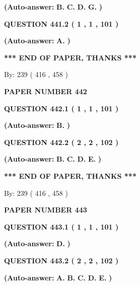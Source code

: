 \documentclass[12pt]{article}
\begin{document}
 
{\textbf{(Auto-answer:}}
{\textbf{\large{
B.}}}
{\textbf{\large{
C.}}}
{\textbf{\large{
D.}}}
{\textbf{\large{
G.}}}
{\textbf{)}}
 
 
  
  
{\textbf{\large{QUESTION
441.2 
 ( 1 , 1 , 101 )
}}}
 
 
{\textbf{(Auto-answer:}}
{\textbf{\large{
A.}}}
{\textbf{)}}
 
 
   
   
\vspace{1.0in} 
{\textbf{\large{ *** END OF PAPER, THANKS *** }}} 
   
   
\hspace{1.0in} By: 
 239 ( 416 ,  458 )
   
   
   
   
\newpage 
\setcounter{page}{ 
   442001 } 
   
   
 {\textbf{ \Large{ PAPER NUMBER  442  }}}
   
   
  
  
{\textbf{\large{QUESTION
442.1 
 ( 1 , 1 , 101 )
}}}
 
 
{\textbf{(Auto-answer:}}
{\textbf{\large{
B.}}}
{\textbf{)}}
 
 
  
  
{\textbf{\large{QUESTION
442.2 
 ( 2 , 2 , 102 )
}}}
 
 
{\textbf{(Auto-answer:}}
{\textbf{\large{
B.}}}
{\textbf{\large{
C.}}}
{\textbf{\large{
D.}}}
{\textbf{\large{
E.}}}
{\textbf{)}}
 
 
   
   
\vspace{1.0in} 
{\textbf{\large{ *** END OF PAPER, THANKS *** }}} 
   
   
\hspace{1.0in} By: 
 239 ( 416 ,  458 )
   
   
   
   
\newpage 
\setcounter{page}{ 
   443001 } 
   
   
 {\textbf{ \Large{ PAPER NUMBER  443  }}}
   
   
  
  
{\textbf{\large{QUESTION
443.1 
 ( 1 , 1 , 101 )
}}}
 
 
{\textbf{(Auto-answer:}}
{\textbf{\large{
D.}}}
{\textbf{)}}
 
 
  
  
{\textbf{\large{QUESTION
443.2 
 ( 2 , 2 , 102 )
}}}
 
 
{\textbf{(Auto-answer:}}
{\textbf{\large{
A.}}}
{\textbf{\large{
B.}}}
{\textbf{\large{
C.}}}
{\textbf{\large{
D.}}}
{\textbf{\large{
E.}}}
{\textbf{)}}
 
\end{document}
